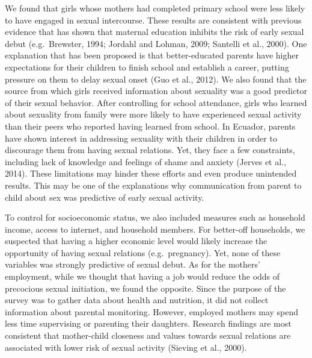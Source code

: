 \documentclass[
]{article}
\begin{document}
We found that girls whose mothers had completed primary school were less
likely to have engaged in sexual intercourse. These results are
consistent with previous evidence that has shown that maternal education
inhibits the risk of early sexual debut (e.g.~Brewster, 1994; Jordahl
and Lohman, 2009; Santelli et al., 2000). One explanation that has been
proposed is that better-educated parents have higher expectations for
their children to finish school and establish a career, putting pressure
on them to delay sexual onset (Guo et al., 2012). We also found that the
source from which girls received information about sexuality was a good
predictor of their sexual behavior. After controlling for school
attendance, girls who learned about sexuality from family were more
likely to have experienced sexual activity than their peers who reported
having learned from school. In Ecuador, parents have shown interest in
addressing sexuality with their children in order to discourage them
from having sexual relations. Yet, they face a few constraints,
including lack of knowledge and feelings of shame and anxiety (Jerves et
al., 2014). These limitations may hinder these efforts and even produce
unintended results. This may be one of the explanations why
communication from parent to child about sex was predictive of early
sexual activity.

To control for socioeconomic status, we also included measures such as
household income, access to internet, and household members. For
better-off households, we suspected that having a higher economic level
would likely increase the opportunity of having sexual relations
(e.g.~pregnancy). Yet, none of these variables was strongly predictive
of sexual debut. As for the mothers' employment, while we thought that
having a job would reduce the odds of precocious sexual initiation, we
found the opposite. Since the purpose of the survey was to gather data
about health and nutrition, it did not collect information about
parental monitoring. However, employed mothers may spend less time
supervising or parenting their daughters. Research findings are most
consistent that mother-child closeness and values towards sexual
relations are associated with lower risk of sexual activity (Sieving et
al., 2000).
\end{document}
